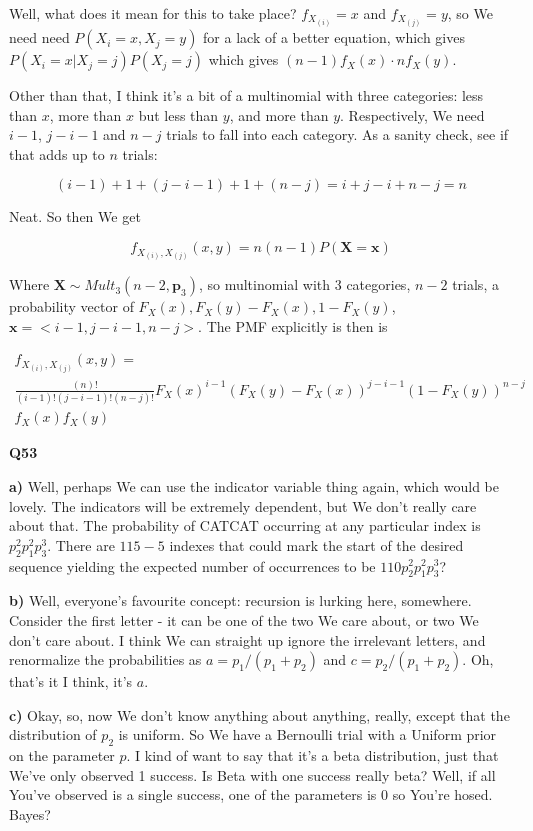 \documentclass{article}
\begin{document}
			Well, what does it mean for this to take place? $f_{X_{(i)}} = x$ and $f_{X_{(j)}} = y$, so We need need $P(X_i = x, X_j = y)$ for a lack of a better equation, which gives $P(X_i=x|X_j=j)P(X_j=j)$ which gives $(n-1)f_X(x)\cdot nf_X(y)$.
			
			Other than that, I think it's a bit of a multinomial with three categories: less than $x$, more than $x$ but less than $y$, and more than $y$. Respectively, We need $i-1$, $j-i-1$ and $n-j$ trials to fall into each category. As a sanity check, see if that adds up to $n$ trials:
			
			\[ (i-1) + 1 + (j-i-1) + 1 + (n-j) = i + j - i + n - j = n \]
			
			Neat. So then We get
			
			\[ f_{X_{(i)}, X_{(j)}}(x, y) = n(n-1)P(\bm{X} = \bm{x}) \]
			
			Where $\bm{X}\sim Mult_3(n-2, \bm{p}_3)$, so multinomial with 3 categories, $n-2$ trials, a probability vector of $F_X(x), F_X(y)-F_X(x), 1-F_X(y)$, $\bm{x} = <i-1, j-i-1, n-j>$. The PMF explicitly is then is
			
			\begin{multline*}
			f_{X_{(i)}, X_{(j)}}(x, y) = \\ 
			\frac{(n)!}{(i-1)!(j-i-1)!(n-j)!}F_X(x)^{i-1}(F_X(y) - F_X(x))^{j-i-1}(1-F_X(y))^{n-j}\\
			f_X(x)f_X(y)			
			\end{multline*}
			
			\hfill
		
		\textbf{Q53}
		
			\textbf{a)} Well, perhaps We can use the indicator variable thing again, which would be lovely. The indicators will be extremely dependent, but We don't really care about that. The probability of CATCAT occurring at any particular index is $p_2^2p_1^2p_3^3$. There are $115-5$ indexes that could mark the start of the desired sequence yielding the expected number of occurrences to be $110p_2^2p_1^2p_3^3$?
			
			\textbf{b)} Well, everyone's favourite concept: recursion is lurking here, somewhere. Consider the first letter - it can be one of the two We care about, or two We don't care about. I think We can straight up ignore the irrelevant letters, and renormalize the probabilities as $a = p_1/(p_1+p_2)$ and $c=p_2/(p_1+p_2)$. Oh, that's it I think, it's $a$.
			
			\textbf{c)} Okay, so, now We don't know anything about anything, really, except that the distribution of $p_2$ is uniform. So We have a Bernoulli trial with a Uniform prior on the parameter $p$. I kind of want to say that it's a beta distribution, just that We've only observed 1 success. Is Beta with one success really beta? Well, if all You've observed is a single success, one of the parameters is 0 so You're hosed. Bayes?
			
\end{document}
